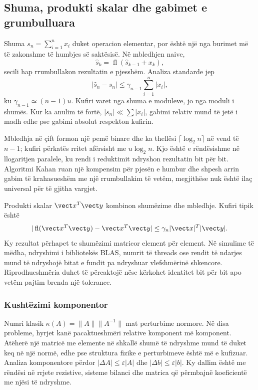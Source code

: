 \subsection{Shuma, produkti skalar dhe gabimet e grumbulluara}
Shuma $s_n=\sum_{i=1}^{n}x_i$ duket operacion elementar, por është një nga burimet më të zakonshme të humbjes së saktësisë. Në mbledhjen naive,
\begin{equation}
 \widehat s_k=\operatorname{fl}(\widehat s_{k-1}+x_k),
\end{equation}
secili hap rrumbullakon rezultatin e pjesshëm. Analiza standarde jep
\begin{equation}
 |\widehat s_n-s_n|\le\gamma_{n-1}\sum_{i=1}^{n}|x_i|,
\end{equation}
ku $\gamma_{n-1}\simeq(n-1)u$. Kufiri varet nga shuma e moduleve, jo nga moduli i shumës. Kur ka anulim të fortë, $|s_n|\ll\sum|x_i|$, gabimi relativ mund të jetë i madh edhe pse gabimi absolut respekton kufirin.

Mbledhja në çift formon një pemë binare dhe ka thellësi $\lceil\log_2n\rceil$ në vend të $n-1$; kufiri përkatës rritet afërsisht me $u\log_2n$. Kjo është e rëndësishme në llogaritjen paralele, ku rendi i reduktimit ndryshon rezultatin bit për bit. Algoritmi Kahan ruan një kompensim për pjesën e humbur dhe shpesh arrin gabim të krahasueshëm me një rrumbullakim të vetëm, megjithëse nuk është ilaç universal për të gjitha vargjet.

Produkti skalar $\vect x^T\vect y$ kombinon shumëzime dhe mbledhje. Kufiri tipik është
\begin{equation}
 |\operatorname{fl}(\vect x^T\vect y)-\vect x^T\vect y|
 \le\gamma_n |\vect x|^T|\vect y|.
\end{equation}
Ky rezultat përhapet te shumëzimi matricor element për element. Në simulime të mëdha, ndryshimi i bibliotekës BLAS, numrit të threads ose rendit të ndarjes mund të ndryshojë bitat e fundit pa ndryshuar vlefshmërinë shkencore. Riprodhueshmëria duhet të përcaktojë nëse kërkohet identitet bit për bit apo vetëm pajtim brenda një tolerance.

\subsubsection{Kushtëzimi komponentor}
Numri klasik $\kappa(A)=\|A\|\|A^{-1}\|$ mat perturbime normore. Në disa probleme, hyrjet kanë pacaktueshmëri relative komponent më komponent. Atëherë një matricë me elemente në shkallë shumë të ndryshme mund të duket keq në një normë, edhe pse struktura fizike e perturbimeve është më e kufizuar. Analiza komponentore përdor $|\Delta A|\le\varepsilon|A|$ dhe $|\Delta b|\le\varepsilon|b|$. Ky dallim është me rëndësi në rrjete rezistive, sisteme bilanci dhe matrica që përmbajnë koeficientë me njësi të ndryshme.

